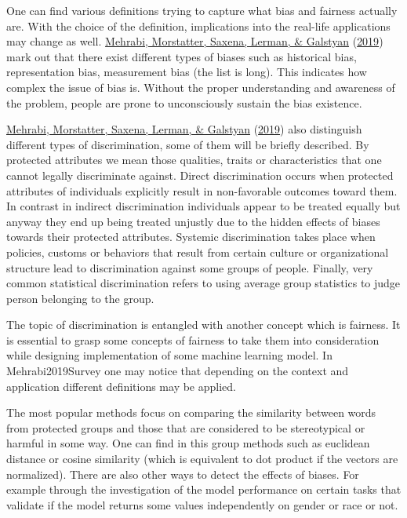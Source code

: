 \documentclass[
  12pt,
]{book}
\begin{document}
One can find various definitions trying to capture what bias and fairness actually are. With the choice of the definition, implications into the real-life applications may change as well. \protect\hyperlink{ref-Mehrabi2019Survey}{Mehrabi, Morstatter, Saxena, Lerman, \& Galstyan} (\protect\hyperlink{ref-Mehrabi2019Survey}{2019}) mark out that there exist different types of biases such as historical bias, representation bias, measurement bias (the list is long). This indicates how complex the issue of bias is. Without the proper understanding and awareness of the problem, people are prone to unconsciously sustain the bias existence.

\protect\hyperlink{ref-Mehrabi2019Survey}{Mehrabi, Morstatter, Saxena, Lerman, \& Galstyan} (\protect\hyperlink{ref-Mehrabi2019Survey}{2019}) also distinguish different types of discrimination, some of them will be briefly described. By protected attributes we mean those qualities, traits or characteristics that one cannot legally discriminate against.
Direct discrimination occurs when protected attributes of individuals explicitly result in non-favorable outcomes toward them. In contrast in indirect discrimination individuals appear to be treated equally but anyway they end up being treated unjustly due to the hidden effects of biases towards their protected attributes. Systemic discrimination takes place when policies, customs or behaviors that result from certain culture or organizational structure lead to discrimination against some groups of people. Finally, very common statistical discrimination refers to using
average group statistics to judge person belonging to the group.

The topic of discrimination is entangled with another concept which is fairness. It is essential to grasp some concepts of fairness to take them into
consideration while designing implementation of some machine learning model. In Mehrabi2019Survey one may notice that depending on the context and application different definitions may be applied.

The most popular methods focus on comparing the similarity between words from protected groups and those that are considered to be stereotypical or harmful in some way. One can find in this group methods such as euclidean distance or cosine similarity (which is equivalent to dot product if the
vectors are normalized). There are also other ways to detect the effects of biases. For example through the investigation of the model performance on certain tasks that validate if the model returns some values
independently on gender or race or not.
\end{document}
